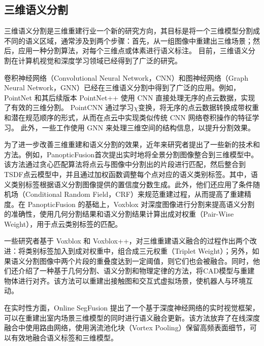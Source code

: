 \subsection{三维语义分割}

\par 三维语义分割是三维重建行业一个新的研究方向，其目标是将一个三维模型分割成不同的语义区域，通常涉及到两个步骤：首先，从一组图像中重建出三维场景；然后，应用一种分割算法，对每个三维点或体素进行语义标注。
目前，三维语义分割在计算机视觉和深度学习领域已经得到了广泛的研究。\cite{3DSemanticParsing,parislille3d}

\par 卷积神经网络（Convolutional Neural Network，CNN）和图神经网络（Graph Neural Network，GNN）已经在三维语义分割中得到了广泛的应用。例如，PointNet 和其后续版本 PointNet++\cite{pointnet,pointnet++} 使用 CNN 直接处理无序的点云数据，实现了有效的三维分割。
PointCNN\cite{PointCNN} 通过学习$\chi$变换，将无序的点云数据转换成带权重和潜在规范顺序的形式，从而在点云中实现类似传统 CNN 网络卷积操作的特征学习。
此外，一些工作使用 GNN 来处理三维空间的结构信息，以提升分割效果。

\par 为了进一步改善三维重建和语义分割的效果，近年来研究者提出了一些新的技术和方法。例如，PanopticFusion\cite{panopticfusion}首次提出实时地将全景分割图像整合到三维模型中。该方法通过贪心匹配算法将点云与图像中分割出的片段进行匹配，然后整合到TSDF点云模型中\cite{VolumetricMethod,voxblox}，并且通过加权函数调整每个点对应的语义类别标签。其中，语义类别标签根据语义分割图像提供的置信度分数生成。此外，他们还应用了条件随机场（Conditional Random Field，CRF）来规范重建过程，从而提高了重建精度。在 PanopticFusion 的基础上，Voxblox 对深度图像进行分割来提高语义分割的准确性，使用几何分割结果和语义分割结果计算出成对权重（Pair-Wise Weight），用于点云类别标签的匹配。
 
\par 一些研究者基于 Voxblox 和 Voxblox++\cite{voxblox++}，对三维重建语义融合的过程作出两个改进\cite{ReconstructingInteractive3D}：将类别标签加入到成对权重中，组合成三元权重（Triplet Weight）；另外，如果语义分割图像中两个片段的重叠度达到一定阈值，则它们也会被融合。同时，他们还介绍了一种基于几何分割、语义分割和物理定律的方法，将CAD模型与重建物体进行对齐。该方法可以重建出接触图和交互式虚拟场景，使机器人与环境互动。

\par 在实时性方面，Online SegFusion\cite{OnlineSegFusion} 提出了一个基于深度神经网络的实时视觉框架，可以在重建出室内场景三维模型的同时进行语义融合更新。该方法放弃了在线深度融合中使用路由网络，使用涡流池化块（Vortex Pooling）保留高频表面细节，可以有效地融合语义标签和三维模型。


